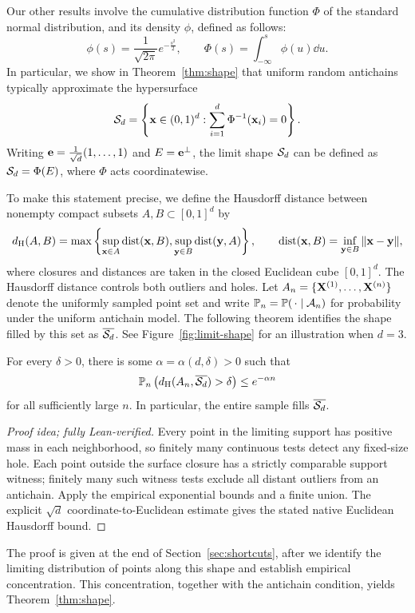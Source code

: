 \documentclass[11pt,letterpaper]{article}
\begin{document}
Our other results involve the cumulative distribution function $\Phi$ of the standard normal distribution, and its density $\phi$, defined as follows:
\[
      \phi(s)=\frac1{\sqrt{2\pi}}e^{-\frac{s^2}{2}},\qquad \Phi(s)=\int_{-\infty}^s\phi(u)\dd u.
\]
In particular, we show in Theorem~\ref{thm:shape} that uniform random antichains typically approximate the hypersurface
\[
      \mathcal S_d=\left\{\mathbf x\in(0,1)^d:\sum_{i=1}^d\Phi^{-1}(\mathbf x_i)=0\right\}.
\]
Writing $\mathbf e=\frac{1}{\sqrt d}(1,\ldots,1)$ and $E=\mathbf e^\perp$, the limit shape $\mathcal S_d$ can be defined as $\mathcal S_d=\Phi(E)$, where $\Phi$ acts coordinatewise.

To make this statement precise, we define the Hausdorff distance between nonempty compact subsets $A,B\subset[0,1]^d$ by
\[
      d_{\rm H}(A,B)=\max\left\{\sup_{\mathbf x\in A}\operatorname{dist}(\mathbf x,B), \sup_{\mathbf y\in B}\operatorname{dist}(\mathbf y,A)\right\}, \qquad \operatorname{dist}(\mathbf x,B)=\inf_{\mathbf y\in B}\|\mathbf x-\mathbf y\|,
\]
where closures and distances are taken in the closed Euclidean cube $[0,1]^d$.
The Hausdorff distance controls both outliers and holes. Let $A_n=\{\mathbf X^{(1)},\ldots,\mathbf X^{(n)}\}$ denote the uniformly sampled point set and write $\mathbb P_n=\mathbb P(\,\cdot\mid\mathcal A_n)$ for probability under the uniform antichain model.
The following theorem identifies the shape filled by this set as $\overline{\mathcal S_d}$.
See Figure~\ref{fig:limit-shape} for an illustration when $d=3$.


\begin{theorem}\label{thm:shape}
      For every $\delta>0$, there is some $\alpha=\alpha(d,\delta)>0$ such that
      \[
            \mathbb P_n\left(d_{\rm H}(A_n,\overline{\mathcal S_d})>\delta \right) \le e^{-\alpha n}
      \]
      for all sufficiently large $n$. In particular, the entire sample fills $\overline{\mathcal S_d}$.
\end{theorem}

\begin{proof}[Proof idea; fully Lean-verified]
Every point in the limiting support has positive mass in each neighborhood, so finitely many continuous tests detect any fixed-size hole. Each point outside the surface closure has a strictly comparable support witness; finitely many such witness tests exclude all distant outliers from an antichain. Apply the empirical exponential bounds and a finite union. The explicit $\sqrt d$ coordinate-to-Euclidean estimate gives the stated native Euclidean Hausdorff bound.
\end{proof}
The proof is given at the end of Section~\ref{sec:shortcuts}, after we identify the limiting distribution of points along this shape and establish empirical concentration. This concentration, together with the antichain condition, yields Theorem~\ref{thm:shape}.
\end{document}
